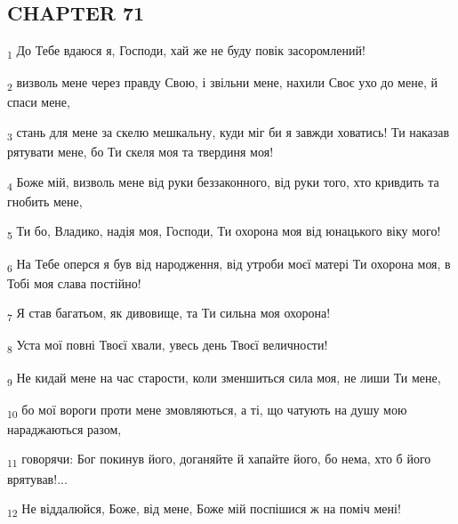 \subsection{CHAPTER 71}
\begin{tcolorbox}
\textsubscript{1} До Тебе вдаюся я, Господи, хай же не буду повік засоромлений!
\end{tcolorbox}
\begin{tcolorbox}
\textsubscript{2} визволь мене через правду Свою, і звільни мене, нахили Своє ухо до мене, й спаси мене,
\end{tcolorbox}
\begin{tcolorbox}
\textsubscript{3} стань для мене за скелю мешкальну, куди міг би я завжди ховатись! Ти наказав рятувати мене, бо Ти скеля моя та твердиня моя!
\end{tcolorbox}
\begin{tcolorbox}
\textsubscript{4} Боже мій, визволь мене від руки беззаконного, від руки того, хто кривдить та гнобить мене,
\end{tcolorbox}
\begin{tcolorbox}
\textsubscript{5} Ти бо, Владико, надія моя, Господи, Ти охорона моя від юнацького віку мого!
\end{tcolorbox}
\begin{tcolorbox}
\textsubscript{6} На Тебе оперся я був від народження, від утроби моєї матері Ти охорона моя, в Тобі моя слава постійно!
\end{tcolorbox}
\begin{tcolorbox}
\textsubscript{7} Я став багатьом, як дивовище, та Ти сильна моя охорона!
\end{tcolorbox}
\begin{tcolorbox}
\textsubscript{8} Уста мої повні Твоєї хвали, увесь день Твоєї величности!
\end{tcolorbox}
\begin{tcolorbox}
\textsubscript{9} Не кидай мене на час старости, коли зменшиться сила моя, не лиши Ти мене,
\end{tcolorbox}
\begin{tcolorbox}
\textsubscript{10} бо мої вороги проти мене змовляються, а ті, що чатують на душу мою нараджаються разом,
\end{tcolorbox}
\begin{tcolorbox}
\textsubscript{11} говорячи: Бог покинув його, доганяйте й хапайте його, бо нема, хто б його врятував!...
\end{tcolorbox}
\begin{tcolorbox}
\textsubscript{12} Не віддалюйся, Боже, від мене, Боже мій поспішися ж на поміч мені!
\end{tcolorbox}
